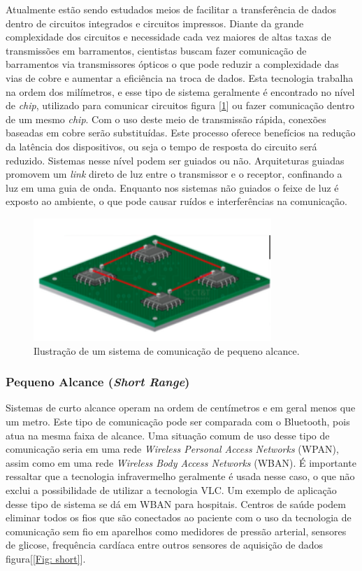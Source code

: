 Atualmente estão sendo estudados meios de facilitar a transferência de dados dentro de circuitos integrados e circuitos impressos. Diante da grande complexidade dos circuitos e necessidade cada vez maiores de altas taxas de transmissões em barramentos, cientistas buscam fazer comunicação de barramentos via transmissores ópticos o que pode reduzir a complexidade das vias de cobre e aumentar a eficiência na troca de dados.
Esta tecnologia trabalha na ordem dos milímetros, e esse tipo de sistema geralmente é encontrado no nível de \textit{chip}, utilizado para comunicar circuitos figura [\ref{Fig: ultra-short}] ou fazer comunicação dentro de um mesmo \textit{chip}. Com o uso deste meio de transmissão rápida, conexões baseadas em cobre serão substituídas. Este processo oferece benefícios na redução da latência dos dispositivos, ou seja o tempo de resposta do circuito será reduzido. Sistemas nesse nível podem ser guiados ou não. Arquiteturas  guiadas promovem um \textit{link} direto de luz entre o transmissor e o receptor, confinando a luz em uma guia de onda. Enquanto nos sistemas não guiados o feixe de luz é exposto ao ambiente, o que pode causar ruídos e interferências na comunicação.\cite{c.kachrisk.bergmankereni.tomkos2013}

\begin{figure}
	\centering
		\includegraphics[width = 9cm]{figuras/ultra-short}
	\caption{Ilustração de um sistema de comunicação de pequeno alcance.}
	\label{Fig: ultra-short}
\end{figure}

\subsubsection{Pequeno Alcance (\textit{Short Range})}

Sistemas de curto alcance operam na ordem de centímetros e em geral menos que um metro. Este tipo de comunicação pode ser comparada com o Bluetooth, pois atua na mesma faixa de alcance. Uma situação comum de uso desse tipo de comunicação seria em uma rede \textit{Wireless Personal Access Networks} (WPAN), assim como em uma rede \textit{Wireless Body Access Networks} (WBAN). É importante ressaltar que a tecnologia infravermelho geralmente é usada nesse caso, o que não exclui a possibilidade de utilizar a tecnologia VLC. Um exemplo de aplicação desse tipo de sistema se dá em WBAN para hospitais. Centros de saúde  podem eliminar todos os fios que são conectados ao paciente com o uso da tecnologia de comunicação sem fio em aparelhos como medidores de pressão arterial, sensores de glicose, frequência cardíaca entre outros sensores de aquisição de dados figura[\ref{Fig: short}].

